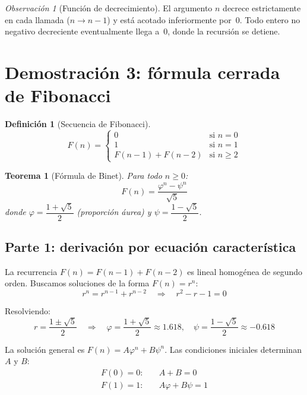 \documentclass[11pt, letterpaper]{article}
\theoremstyle{definition}
\newtheorem{definition}{Definición}[section]
\theoremstyle{plain}
\newtheorem{theorem}{Teorema}[section]
\theoremstyle{remark}
\newtheorem{remark}{Observación}[section]
\begin{document}
\begin{remark}[Función de decrecimiento]
El argumento $n$ decrece estrictamente en cada llamada ($n \to n-1$)
y está acotado inferiormente por~0. Todo entero no negativo
decreciente eventualmente llega a~0, donde la recursión se detiene.
\end{remark}

\section{Demostración 3: fórmula cerrada de Fibonacci}

\begin{definition}[Secuencia de Fibonacci]
\[
  F(n) = \begin{cases}
    0 & \text{si } n = 0 \\
    1 & \text{si } n = 1 \\
    F(n-1) + F(n-2) & \text{si } n \geq 2
  \end{cases}
\]
\end{definition}

\begin{theorem}[Fórmula de Binet]\label{thm:binet}
Para todo $n \geq 0$:
\[
  F(n) = \frac{\varphi^n - \psi^n}{\sqrt{5}}
\]
donde $\varphi = \dfrac{1 + \sqrt{5}}{2}$ (proporción áurea) y
$\psi = \dfrac{1 - \sqrt{5}}{2}$.
\end{theorem}

\subsection{Parte 1: derivación por ecuación característica}

La recurrencia $F(n) = F(n-1) + F(n-2)$ es lineal homogénea de
segundo orden. Buscamos soluciones de la forma $F(n) = r^n$:
\[
  r^n = r^{n-1} + r^{n-2}
  \quad\Longrightarrow\quad
  r^2 - r - 1 = 0
\]

Resolviendo:
\[
  r = \frac{1 \pm \sqrt{5}}{2}
  \quad\Longrightarrow\quad
  \varphi = \frac{1 + \sqrt{5}}{2} \approx 1.618,
  \quad
  \psi = \frac{1 - \sqrt{5}}{2} \approx -0.618
\]

La solución general es $F(n) = A\varphi^n + B\psi^n$. Las condiciones
iniciales determinan $A$ y $B$:
\begin{align*}
  F(0) = 0: \quad & A + B = 0 \tag{I} \\
  F(1) = 1: \quad & A\varphi + B\psi = 1 \tag{II}
\end{align*}
\end{document}

